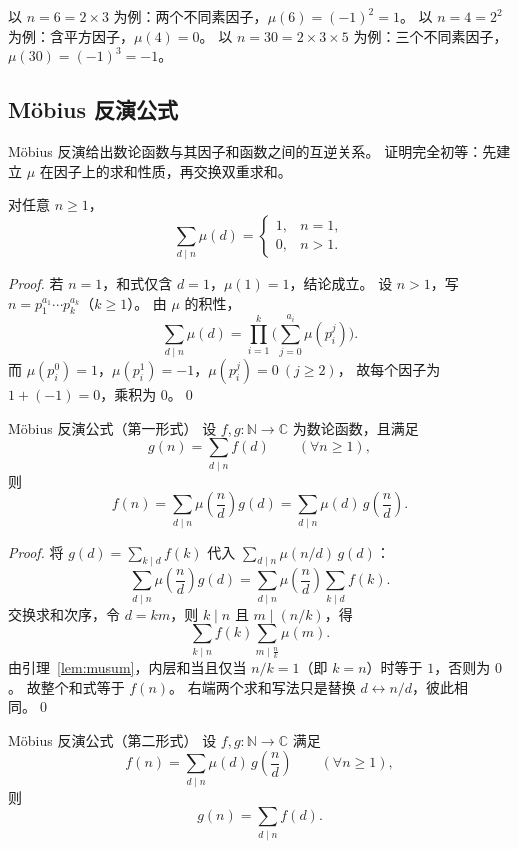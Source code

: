 以 $n=6=2\times3$ 为例：两个不同素因子，$\mu(6)=(-1)^2=1$。
以 $n=4=2^2$ 为例：含平方因子，$\mu(4)=0$。
以 $n=30=2\times3\times5$ 为例：三个不同素因子，$\mu(30)=(-1)^3=-1$。
 
\subsection{Möbius 反演公式}

Möbius 反演给出数论函数与其因子和函数之间的互逆关系。
证明完全初等：先建立 $\mu$ 在因子上的求和性质，再交换双重求和。

\begin{lemma}{}{}\label{lem:musum}
对任意 $n \ge 1$，
\[
\sum_{d \mid n} \mu(d) =
\begin{cases}
1, & n = 1,\\
0, & n > 1.
\end{cases}
\]
\end{lemma}

\begin{proof}
若 $n = 1$，和式仅含 $d = 1$，$\mu(1)=1$，结论成立。
设 $n > 1$，写 $n = p_1^{a_1} \cdots p_k^{a_k}$（$k \ge 1$）。
由 $\mu$ 的积性，
\[
\sum_{d \mid n} \mu(d)
= \prod_{i=1}^{k}
  \Biggl( \sum_{j=0}^{a_i} \mu(p_i^{j}) \Biggr).
\]
而 $\mu(p_i^{0})=1$，$\mu(p_i^{1})=-1$，$\mu(p_i^{j})=0\ (j\ge 2)$，
故每个因子为 $1+(-1)=0$，乘积为 $0$。\qed
\end{proof}

\begin{theorem}{Möbius 反演公式（第一形式）}{}
设 $f, g: \mathbb{N} \to \mathbb{C}$ 为数论函数，且满足
\[
g(n) = \sum_{d \mid n} f(d) \qquad (\forall n \ge 1),
\]
则
\[
f(n)
= \sum_{d \mid n} \mu\!\left(\frac{n}{d}\right) g(d)
= \sum_{d \mid n} \mu(d)\, g\!\left(\frac{n}{d}\right).
\]
\end{theorem}

\begin{proof}
将 $g(d)=\sum_{k\mid d} f(k)$ 代入 $\sum_{d\mid n}\mu(n/d)\,g(d)$：
\[
\sum_{d \mid n} \mu\!\left(\frac{n}{d}\right) g(d)
= \sum_{d \mid n} \mu\!\left(\frac{n}{d}\right) \sum_{k \mid d} f(k).
\]
交换求和次序，令 $d=km$，则 $k\mid n$ 且 $m\mid(n/k)$，得
\[
\sum_{k \mid n} f(k)
\sum_{m \mid \frac{n}{k}} \mu(m).
\]
由引理~\ref{lem:musum}，内层和当且仅当 $n/k=1$（即 $k=n$）时等于 $1$，否则为 $0$。
故整个和式等于 $f(n)$。
右端两个求和写法只是替换 $d\leftrightarrow n/d$，彼此相同。\qed
\end{proof}

\begin{theorem}{Möbius 反演公式（第二形式）}{}
设 $f, g: \mathbb{N} \to \mathbb{C}$ 满足
\[
f(n) = \sum_{d \mid n} \mu(d)\, g\!\left(\frac{n}{d}\right)
\qquad (\forall n \ge 1),
\]
则
\[
g(n) = \sum_{d \mid n} f(d).
\]
\end{theorem}

